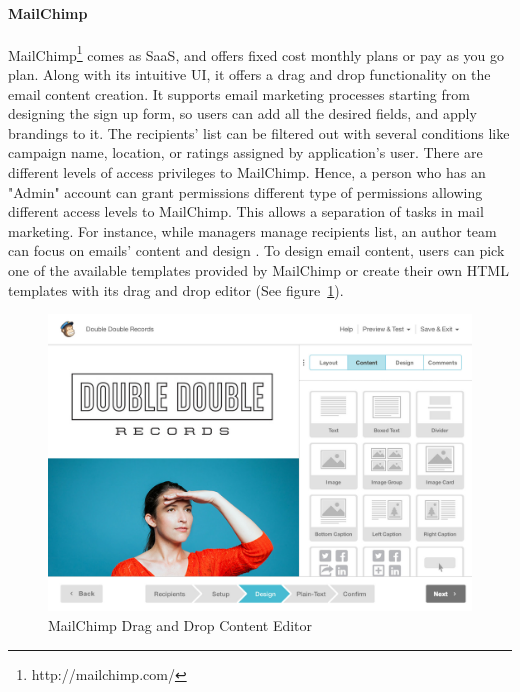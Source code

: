 \paragraph{MailChimp}
MailChimp\footnote{http://mailchimp.com/} comes as \ac{SaaS}, and offers fixed cost monthly plans or pay as you go plan. Along with its intuitive \ac{UI}, it offers a drag and drop functionality on the email content creation. It supports email marketing processes starting from designing the sign up form, so users can add all the desired fields, and apply brandings to it. The recipients' list can be filtered out with several conditions like campaign name, location, or ratings assigned by application's user. There are different levels of access privileges to MailChimp. Hence, a person who has an "Admin" account can grant permissions different type of permissions allowing different access levels to MailChimp. This allows a separation of tasks in mail marketing. For instance, while managers manage recipients list, an author team can focus on emails' content and design \citep{TheRocketScienceGroupLLC2013}. To design email content, users can pick one of the available templates provided by MailChimp or create their own \ac{HTML} templates with its drag and drop editor (See figure~\ref{fig:MailChimp-DragAndDropEditor}).
\vspace{1cm}

\begin{figure}[H]
	\centering
	\includegraphics[width=1.00\textwidth]{imgs/MailChimp-DragAndDropEditor.jpg}
	\caption[MailChimp Drag and Drop Content Editor]{MailChimp Drag and Drop Content Editor \citep{TheRocketScienceGroupLLC2013a}}
	\label{fig:MailChimp-DragAndDropEditor}
\end{figure}

